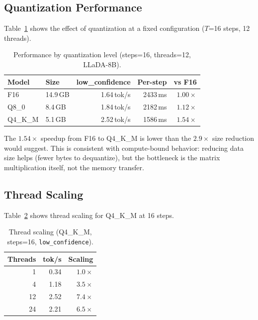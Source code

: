 \documentclass[11pt]{article}
\begin{document}
\subsection{Quantization Performance}

Table~\ref{tab:quant} shows the effect of quantization at a fixed configuration
($T$=16 steps, 12 threads).

\begin{table}[h]
\centering
\caption{Performance by quantization level (steps=16, threads=12, LLaDA-8B).}
\label{tab:quant}
\begin{tabular}{llrrr}
\toprule
\textbf{Model} & \textbf{Size} & \textbf{low\_confidence} & \textbf{Per-step} & \textbf{vs F16} \\
\midrule
F16 & 14.9\,GB & 1.64\,tok/s & 2433\,ms & $1.00\times$ \\
Q8\_0 & 8.4\,GB & 1.84\,tok/s & 2182\,ms & $1.12\times$ \\
Q4\_K\_M & 5.1\,GB & 2.52\,tok/s & 1586\,ms & $1.54\times$ \\
\bottomrule
\end{tabular}
\end{table}

The $1.54\times$ speedup from F16 to Q4\_K\_M is lower than the $2.9\times$ size
reduction would suggest. This is consistent with compute-bound behavior: reducing data
size helps (fewer bytes to dequantize), but the bottleneck is the matrix multiplication
itself, not the memory transfer.

\subsection{Thread Scaling}

Table~\ref{tab:threads} shows thread scaling for Q4\_K\_M at 16 steps.

\begin{table}[h]
\centering
\caption{Thread scaling (Q4\_K\_M, steps=16, \texttt{low\_confidence}).}
\label{tab:threads}
\begin{tabular}{rrr}
\toprule
\textbf{Threads} & \textbf{tok/s} & \textbf{Scaling} \\
\midrule
1 & 0.34 & $1.0\times$ \\
4 & 1.18 & $3.5\times$ \\
12 & 2.52 & $7.4\times$ \\
24 & 2.21 & $6.5\times$ \\
\bottomrule
\end{tabular}
\end{table}
\end{document}
